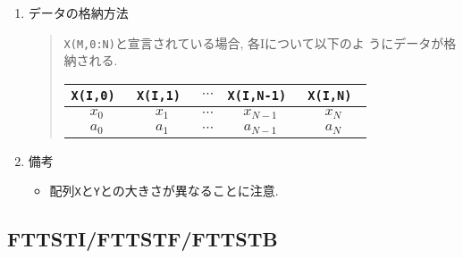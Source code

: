 \documentclass[a4j]{jarticle}
\begin{document}
\begin{enumerate}
  \item データの格納方法
  \begin{quote}
  
  {\tt X(M,0:N)}と宣言されている場合, 各Iについて以下のよ
   うにデータが格納される.

    \begin{tabular}{|c|c|c|c|c|}\hline
     \tt X(I,0) & \tt X(I,1) & 
     $\cdots$ & \tt X(I,N-1) & \tt X(I,N) \\\hline\hline
      $x_0$ & $x_1$ & 
     $\cdots$ & $x_{N-1}$ & $x_{N}$ \\\hline
      $a_0$ & $a_1$ & 
     $\cdots$ & $a_{N-1}$ & $a_{N}$ \\\hline
    \end{tabular}
  \end{quote}
  
  \item 備考
 
   \begin{itemize}
    \item 配列{\tt X}と{\tt Y}との大きさが異なることに注意.
    \end{itemize}

\end{enumerate}

\subsection{FTTSTI/FTTSTF/FTTSTB}
\end{document}
